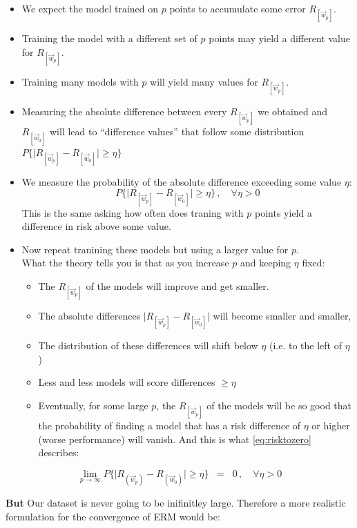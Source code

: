 \begin{frame}
			\begin{itemize}
			\item We expect the model trained on $p$ points to accumulate some error $R_{[\vec w_p]}$.
			\item Training the model with a different set of $p$ points may yield a different value for $R_{[\vec w_p]}$.
			\item Training many models with $p$ will yield many values for $R_{[\vec w_p]}$.
			\item Measuring the absolute difference between every $R_{[\vec w_p]}$ we obtained and $R_{[\vec w_0]}$ will lead to ``difference values'' that follow some distribution $P\bigg\{ 
					{
						\Big|R_{[\vec w_p]} - R_{[\vec w_0]}\Big| 
					}
				\geq \eta \bigg\}$
			\item We measure the probability of the absolute difference exceeding some value $\eta$:
			\begin{equation}
			P\bigg\{ 
					{
						\Big|R_{[\vec w_p]} - R_{[\vec w_0]}\Big| 
					}
				\geq \eta \bigg\}\,, \quad \forall \eta > 0
			\end{equation}
			This is the same asking how often does traning with $p$ points yield a difference in risk above some value.
			\item Now repeat tranining these models but using a larger value for $p$.\\
			What the theory tells you is that as you increase $p$ and keeping $\eta$ fixed:
			\begin{itemize}
			\item The $R_{[\vec w_p]}$ of the models will improve and get smaller.
			\item The absolute differences $\Big|R_{[\vec w_p]} - R_{[\vec w_0]}\Big|$ will become smaller and smaller,
			\item The distribution of these differences will shift below $\eta$ (i.e. to the left of $\eta$)
			\item Less and less models will score differences $\ge \eta$
			\item Eventually, for some large $p$, the $R_{[\vec w_p]}$ of the models will be so good that the probability of finding a model that has a risk difference of $\eta$ or higher (worse performance) will vanish. And this is what \eqref{eq:risktozero} describes:
			\end{itemize}
			
			\end{itemize}
			
			\begin{equation}
				\lim_{p \to \infty} P\bigg\{ 
					{
						\Big|R_{(\vec w_p)} - R_{(\vec w_0)}\Big| 
					}
				\geq \eta \bigg\}\;\;=\;\; 0 \,, \quad \forall \eta > 0
				\label{eq:risktozero}
			\end{equation}
			
			\textbf{But} Our dataset is never going to be inifinitley large. Therefore a more realistic formulation for the convergence of ERM would be:
			
			
\end{frame}
